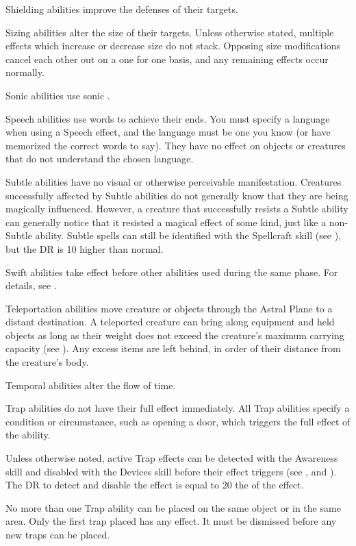         Shielding abilities improve the defenses of their targets.

         Sizing abilities alter the size of their targets.
        Unless otherwise stated, multiple effects which increase or decrease size do not stack.
        Opposing size modifications cancel each other out on a one for one basis, and any remaining effects occur normally.

         Sonic abilities use sonic .

         Speech abilities use words to achieve their ends.
        You must specify a language when using a Speech effect, and the language must be one you know (or have memorized the correct words to say). They have no effect on objects or creatures that do not understand the chosen language.

         Subtle abilities have no visual or otherwise perceivable manifestation.
        Creatures successfully affected by Subtle abilities do not generally know that they are being magically influenced.
        However, a creature that successfully resists a Subtle ability can generally notice that it resisted a magical effect of some kind, just like a non-Subtle ability.
        Subtle spells can still be identified with the Spellcraft skill (see ), but the DR is 10 higher than normal.

         Swift abilities take effect before other abilities used during the same phase.
        For details, see .

         Teleportation abilities move creature or objects through the Astral Plane to a distant destination.
        A teleported creature can bring along equipment and held objects as long as their weight does not exceed the creature's maximum carrying capacity (see ). Any excess items are left behind, in order of their distance from the creature's body.

         Temporal abilities alter the flow of time.

         Trap abilities do not have their full effect immediately.
        All Trap abilities specify a condition or circumstance, such as opening a door, which triggers the full effect of the ability.
        \par Unless otherwise noted, active Trap effects can be detected with the Awareness skill and disabled with the Devices skill before their effect triggers (see , and ).
        The DR to detect and disable the effect is equal to 20 \add the  of the effect.
        \par No more than one Trap ability can be placed on the same object or in the same area.
        Only the first trap placed has any effect.
        It must be dismissed before any new traps can be placed.

